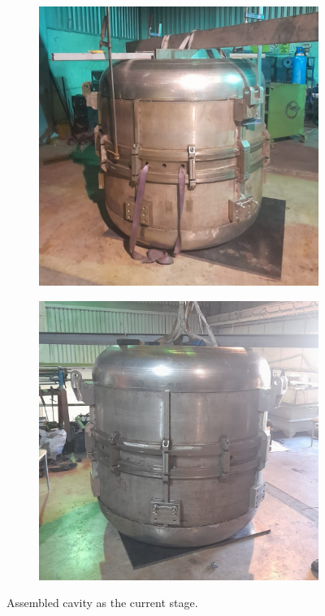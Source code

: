 \documentclass[a4paper,oneside,12pt]{report}
\numberwithin{equation}{chapter}
\begin{document}
\begin{figure}
    \captionsetup[subfigure]{justification=centering}
    \captionsetup{justification=centering}
    \centering
    \begin{subfigure}{.5\textwidth}
      \centering
      \includegraphics[width=.96\linewidth]{./figures/manif/assembled/rhodo_assembled_2_cropped.jpeg}
    \end{subfigure}%
    \centering
    \begin{subfigure}{.5\textwidth}
      \centering
      \includegraphics[width=.96\linewidth]{./figures/manif/assembled/rhodo_assembled_1_cropped.jpeg}
    \end{subfigure}
    \caption{Assembled cavity as the current stage.}
    \label{fig:manif_assembled}
\end{figure}
\end{document}
